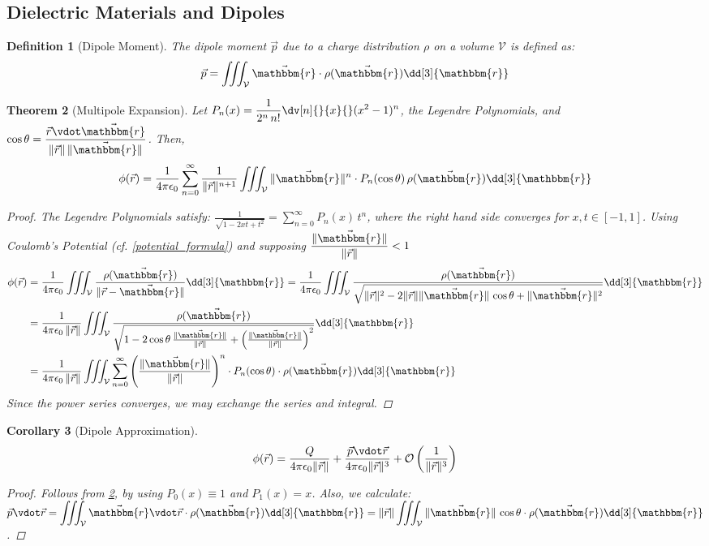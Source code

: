 \documentclass[12pt]{article}
\newcommand*{\rv}{\vec{r}}
\newcommand*{\ir}{\mathbbm{r}}
\newcommand*{\irv}{\vec{\mathbbm{r}}}
\newcommand*{\ee}{\epsilon_0}
\newcommand*{\vol}{\mathcal{V}}
\newtheorem{theorem}{Theorem}[subsection]
\newtheorem{definition}[theorem]{Definition}
\newtheorem{corollary}[theorem]{Corollary}
\begin{document}
\pagebreak

\subsection{Dielectric Materials and Dipoles}

\begin{definition}[Dipole Moment]
  The dipole moment $\vec{p}$ due to a charge distribution $\rho$ on a volume $\vol$ is defined as:  $$\vec{p}=\iiint_{\vol}\irv\cdot\rho(\irv)\dd[3]{\ir}$$
\end{definition}

\begin{theorem}[Multipole Expansion]
  \label{multipole}
  Let $\displaystyle P_n(x)=\frac{1}{2^n\,n!}\dv[n]{}{x}{}(x^2-1)^n$, the Legendre Polynomials, and $\cos{\theta}=\dfrac{\rv\vdot\irv}{\|\rv\|\,\|\irv\|}$. Then, $$\phi(\rv)=\frac{1}{4\pi\ee}\sum_{n=0}^\infty \frac{1}{\|\rv\|^{n+1}}\iiint_{\vol}\|\irv\|^n\cdot P_n(\cos{\theta})\,\rho(\irv)\dd[3]{\ir}$$
  \begin{proof}
    The Legendre Polynomials satisfy: $\displaystyle\frac{1}{\sqrt{1-2xt+t^2}}=\sum_{n=0}^\infty P_n(x)\,t^n$, where the right hand side converges for $x,t\in[-1,1]$. Using Coulomb's Potential (cf. \ref{potential_formula}) and supposing $\dfrac{\|\irv\|}{\|\rv\|}<1$
    \begin{align*}
      \phi(\rv)&=\frac{1}{4\pi\ee}\iiint_{\vol}\frac{\rho(\irv)}{\|\rv-\irv\|}\dd[3]{\ir}=\frac{1}{4\pi\ee}\iiint_{\vol}\frac{\rho(\irv)}{\sqrt{\|\rv\|^2-2\|\rv\|\|\irv\|\,\cos{\theta}+\|\irv\|^2}}\dd[3]{\ir}\\
      &=\frac{1}{4\pi\ee\,\|\rv\|}\iiint_{\vol}\frac{\rho(\irv)}{\sqrt{1-2\cos{\theta}\,\frac{\|\irv\|}{\|\rv\|}+\left(\frac{\|\irv\|}{\|\rv\|}\right)^2}}\dd[3]{\ir}\\
      &=\frac{1}{4\pi\ee\,\|\rv\|}\iiint_{\vol}\sum_{n=0}^\infty \left(\frac{\|\irv\|}{\|\rv\|}\right)^n\cdot P_n(\cos{\theta}) \cdot\rho(\irv)\dd[3]{\ir}
    \end{align*}
    Since the power series converges, we may exchange the series and integral.
  \end{proof}
\end{theorem}

\begin{corollary}[Dipole Approximation]
  $$\phi(\rv)=\frac{Q}{4\pi\ee\|\rv\|}+\frac{\vec{p}\vdot\rv}{4\pi\ee\|\rv\|^3}+\mathcal{O}\left(\dfrac{1}{\|\rv\|^3}\right)$$
  \begin{proof}
    Follows from \ref{multipole}, by using $P_0(x)\equiv 1$ and $P_1(x)=x$. Also, we calculate: $\displaystyle \vec{p}\vdot\rv=\iiint_{\vol}\irv\vdot\rv\cdot\rho(\irv)\dd[3]{\ir}=\|\rv\|\iiint_{\vol}\|\irv\|\,\cos{\theta}\cdot\rho(\irv)\dd[3]{\ir}$.
  \end{proof}
\end{corollary}
\end{document}
